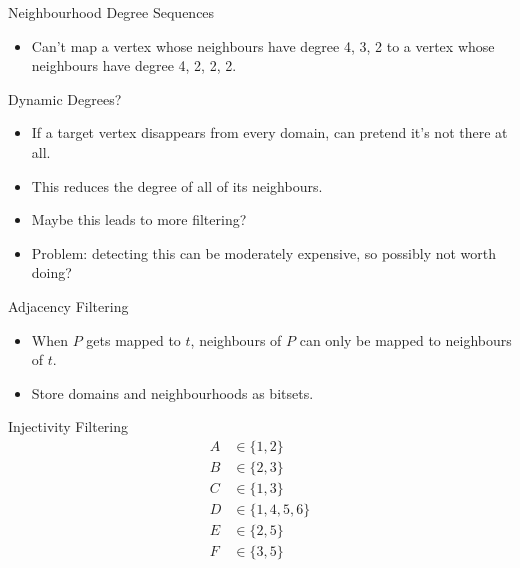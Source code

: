 \documentclass[aspectratio=169,compress,10pt]{beamer}
\begin{document}
\begin{frame}{Neighbourhood Degree Sequences}
    \begin{itemize}
        \item Can't map a vertex whose neighbours have degree 4, 3, 2 to a vertex whose neighbours
            have degree 4, 2, 2, 2.
    \end{itemize}
\end{frame}

\begin{frame}{Dynamic Degrees?}
    \begin{itemize}
        \item If a target vertex disappears from every domain, can pretend it's not there at all.
        \item This reduces the degree of all of its neighbours.
        \item Maybe this leads to more filtering?
        \item <2-> Problem: detecting this can be moderately expensive, so possibly not worth doing?
    \end{itemize}
\end{frame}

\begin{frame}{Adjacency Filtering}
    \begin{itemize}
        \item When $P$ gets mapped to $t$, neighbours of $P$ can only be mapped to neighbours
            of $t$.
        \item Store domains and neighbourhoods as bitsets.
    \end{itemize}
\end{frame}

\begin{frame}{Injectivity Filtering}
    \begin{align*}
        A &\in \{ 1, 2 \} \\
        B &\in \{ 2, 3 \} \\
        C &\in \{ 1, 3 \} \\
        D &\in \{ 1, 4, 5, 6 \} \\
        E &\in \{ 2, 5 \} \\
        F &\in \{ 3, 5 \}
    \end{align*}
\end{frame}
\end{document}
